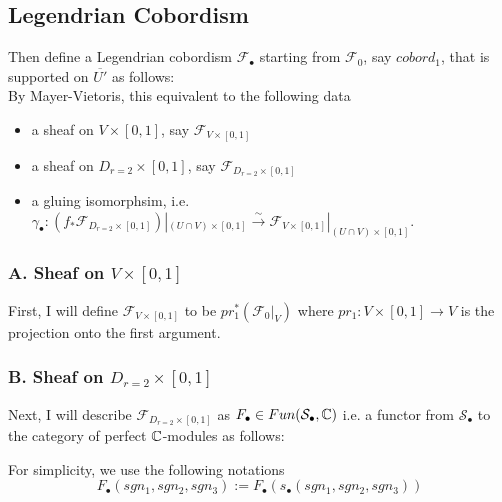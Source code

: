 \subsection*{Legendrian Cobordism}
Then define a Legendrian cobordism $\mathscr{F}_\bullet$ starting from $\mathscr{F}_0$, say $cobord_1$, that is supported on $\overline{U'}$ as follows:\\

By Mayer-Vietoris, this equivalent to the following data
\begin{itemize}
\item a sheaf on $V\times [0,1]$, say $\mathscr{F}_{V\times [0,1]}$

\item a sheaf on $D_{r=2}\times [0,1]$, say $\mathscr{F}_{D_{r=2}\times [0,1]}$

\item a gluing isomorphsim, i.e. $\gamma_\bullet : (f_*\mathscr{F}_{D_{r=2}\times [0,1]})|_{(U\cap V)\times [0,1]} \xrightarrow{\sim} \mathscr{F}_{V\times [0,1]}|_{(U\cap V)\times [0,1]}$.
\end{itemize}
\subsubsection*{A. Sheaf on $V\times [0,1]$}
First, I will define $\mathscr{F}_{V\times [0,1]}$ to be $pr_1^*(\mathscr{F}_0|_V)$ where $pr_1 : V \times [0,1] \rightarrow V$ is the projection onto the first argument.
\subsubsection{B. Sheaf on $D_{r=2}\times [0,1]$}
Next, I will describe $\mathscr{F}_{D_{r=2}\times [0,1]}$ as $F_\bullet \in Fun(\mathcal{S}_\bullet,\mathbb{C})$ i.e. a functor from $\mathcal{S}_\bullet$ to the category of perfect $\mathbb{C}$-modules as follows: 

For simplicity, we use the following notations
\[
F_\bullet(sgn_1,sgn_2,sgn_3):= F_\bullet(s_\bullet(sgn_1,sgn_2,sgn_3))
\]

